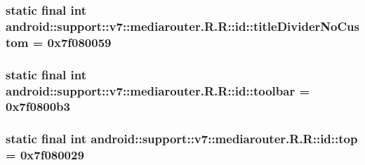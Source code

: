 \hypertarget{classandroid_1_1support_1_1v7_1_1mediarouter_1_1_r_1_1id_0072c97d43880f2a44198e12f8a3cec6}{
\subsubsection[{titleDividerNoCustom}]{\setlength{\rightskip}{0pt plus 5cm}static final int android::support::v7::mediarouter.R.R::id::titleDividerNoCustom = 0x7f080059}}
\label{classandroid_1_1support_1_1v7_1_1mediarouter_1_1_r_1_1id_0072c97d43880f2a44198e12f8a3cec6}


\hypertarget{classandroid_1_1support_1_1v7_1_1mediarouter_1_1_r_1_1id_97d013237f74910762b6a527932ab91e}{
\subsubsection[{toolbar}]{\setlength{\rightskip}{0pt plus 5cm}static final int android::support::v7::mediarouter.R.R::id::toolbar = 0x7f0800b3}}
\label{classandroid_1_1support_1_1v7_1_1mediarouter_1_1_r_1_1id_97d013237f74910762b6a527932ab91e}


\hypertarget{classandroid_1_1support_1_1v7_1_1mediarouter_1_1_r_1_1id_b25e076450211e2860740b2d04912b6b}{
\subsubsection[{top}]{\setlength{\rightskip}{0pt plus 5cm}static final int android::support::v7::mediarouter.R.R::id::top = 0x7f080029}}
\label{classandroid_1_1support_1_1v7_1_1mediarouter_1_1_r_1_1id_b25e076450211e2860740b2d04912b6b}


